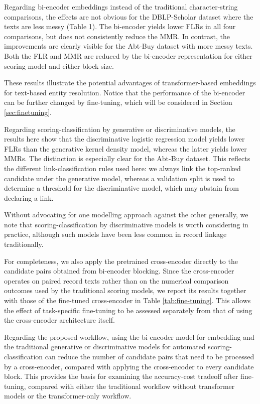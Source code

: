 Regarding bi-encoder embeddings instead of the traditional character-string comparisons,
the effects are not obvious for the DBLP-Scholar dataset where the texts are less messy
(Table 1). The bi-encoder yields lower FLRs in all four comparisons, but does not
consistently reduce the MMR. In contrast, the improvements are clearly visible for the
Abt-Buy dataset with more messy texts. Both the FLR and MMR are reduced by the
bi-encoder representation for either scoring model and either block size.

These results illustrate the potential advantages of transformer-based
embeddings for text-based entity resolution. Notice that the performance of the bi-encoder can be further changed
by fine-tuning, which will be considered in Section \ref{sec:finetuning}.

Regarding scoring-classification by generative or discriminative models, the results here
show that the discriminative logistic regression model yields lower FLRs than the
generative kernel density model, whereas the latter yields lower MMRs. The distinction
is especially clear for the Abt-Buy dataset. This reflects the different link-classification
rules used here: we always link the top-ranked candidate under the generative model,
whereas a validation split is used to determine a threshold for the discriminative model,
which may abstain from declaring a link.

Without advocating for one modelling approach against the other generally, we note that
scoring-classification by discriminative models is worth considering in practice, although
such models have been less common in record linkage traditionally.

For completeness, we also apply the pretrained cross-encoder directly to the candidate
pairs obtained from bi-encoder blocking. Since the cross-encoder operates on paired
record texts rather than on the numerical comparison outcomes used by the traditional
scoring models, we report its results together with those of the fine-tuned cross-encoder
in Table \ref{tab:fine-tuning}. This allows the effect of task-specific fine-tuning to be
assessed separately from that of using the cross-encoder architecture itself.

Regarding the proposed workflow, using the bi-encoder model for embedding and
the traditional generative or discriminative models for automated
scoring-classification can reduce the number of candidate pairs that need to be
processed by a cross-encoder, compared with applying the cross-encoder to every
candidate block. This provides the basis for examining the accuracy-cost tradeoff
after fine-tuning, compared with either the traditional workflow without transformer
models or the transformer-only workflow.

